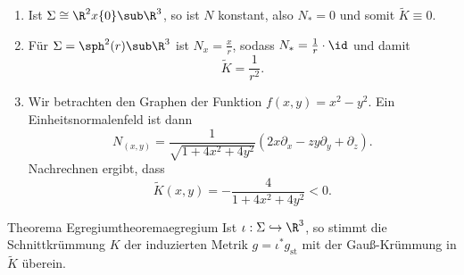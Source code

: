 \begin{beispiele}
\begin{enumerate}
\item Ist $\Sigma \cong \R^2 x \{0\} \sub \R^3$, so ist $N$ konstant, also $N_\ast = 0$ und somit $\tilde{K}\equiv 0$.
\item Für $\Sigma = \sph^2(r) \sub \R^3$ ist $N_x=\frac{x}{r}$, sodass $N_\ast = \frac{1}{r} \cdot \id$ und damit 
\begin{equation}
\tilde{K} = \frac{1}{r^2}.
\end{equation}
\item Wir betrachten den Graphen der Funktion $f(x,y)=x^2-y^2$. Ein Einheitsnormalenfeld ist dann
\begin{equation}
N_{(x,y)}=\frac{1}{\sqrt{1+4x^2+4y^2}} (2x \partial_x - zy\partial_y+\partial_z).
\end{equation}
Nachrechnen ergibt, dass
\begin{equation}
\tilde{K}(x,y)=- \frac{4}{1+4x^2+4y^2} < 0.
\end{equation}
\end{enumerate}
\end{beispiele}
\begin{theorem}{Theorema Egregium}{theoremaegregium}
Ist $\iota: \Sigma \hookrightarrow \R^3$, so stimmt die Schnittkrümmung $K$ der induzierten Metrik $g=\iota^\ast g_\text{st}$ mit der Gauß-Krümmung in $\tilde{K}$ überein.
\end{theorem}
